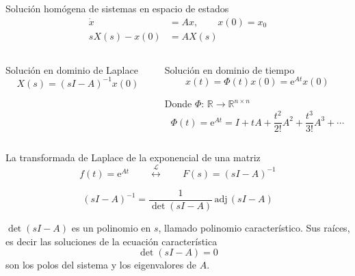 \documentclass[presentation,aspectratio=1610]{beamer}
\begin{document}
\begin{frame}[label={sec:org390366b}]{Solución homógena de sistemas en espacio de estados}
\small
\begin{align*}
\dot{x} &= Ax, \qquad x(0) = x_0\\
 sX(s) - x(0) &= AX(s)
 \end{align*}
\pause

\begin{columns}
\begin{column}{0.5\columnwidth}
\begin{block}{Solución en dominio de Laplace}
\[X(s) = (sI-A)^{-1}x(0)\]

\pause
\end{block}
\end{column}

\begin{column}{0.5\columnwidth}
\begin{block}{Solución en dominio de tiempo}
\[ x(t) = \Phi(t)x(0) = \mathrm{e}^{At}x(0)\]

Donde  \(\Phi:\,\mathbb{R} \rightarrow \mathbb{R}^{n\times n}\) \[\Phi(t)=\mathrm{e}^{At} = I + tA + \frac{t^2}{2!}A^2 + \frac{t^3}{3!}A^3 + \cdots\] 
\end{block}
\end{column}
\end{columns}
\end{frame}

\begin{frame}[label={sec:org7794c26}]{La transformada de Laplace de la exponencial de una matriz}
\[ f(t)=\mathrm{e}^{At} \qquad \overset{\mathcal{L}}{\longleftrightarrow} \qquad F(s) = (sI-A)^{-1} \]

\pause

\[(sI-A)^{-1} = \frac{1}{\det (sI-A)} \, \text{adj}\, (sI-A) \]

\(\det (sI-A)\) es un polinomio en \(s\), llamado \alert{polinomio característico}. Sus raíces, es decir las soluciones de la \alert{ecuación característica}
\[ \det(sI-A) = 0\]
son los \alert{polos} del sistema y los eigenvalores de \(A\).
\end{frame}
\end{document}

